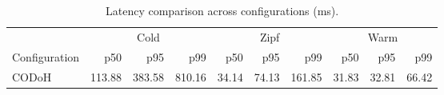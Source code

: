 \begin{table}[t]
\centering
\caption{Latency comparison across configurations (ms).}
\label{tab:comparison}
\small
\begin{tabular}{l rrr rrr rrr}
\toprule
 & \multicolumn{3}{c}{Cold} & \multicolumn{3}{c}{Zipf} & \multicolumn{3}{c}{Warm} \\
\cmidrule(lr){2-4} \cmidrule(lr){5-7} \cmidrule(lr){8-10}
Configuration & p50 & p95 & p99 & p50 & p95 & p99 & p50 & p95 & p99 \\
\midrule
CODoH & 113.88 & 383.58 & 810.16 & 34.14 & 74.13 & 161.85 & 31.83 & 32.81 & 66.42 \\
\bottomrule
\end{tabular}
\end{table}
